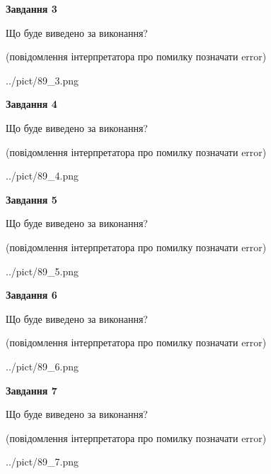 \documentclass[12pt, ukrainian]{article}
\begin{document}
{\begin {large}
{\begin {center}\textbf{Завдання 3}\end {center}}\par
Що буде виведено за виконання?\par
 (повідомлення інтерпретатора про помилку позначати error)\par
\begin{center}
	{../pict/89_3.png}
\end{center}
\newpage

{\begin {center}\textbf{Завдання 4}\end {center}}\par
Що буде виведено за виконання?\par
 (повідомлення інтерпретатора про помилку позначати error)\par
\begin{center}
	{../pict/89_4.png}
\end{center}
\newpage

{\begin {center}\textbf{Завдання 5}\end {center}}\par
Що буде виведено за виконання?\par
 (повідомлення інтерпретатора про помилку позначати error)\par
\begin{center}
	{../pict/89_5.png}
\end{center}
\newpage

{\begin {center}\textbf{Завдання 6}\end {center}}\par
Що буде виведено за виконання?\par
 (повідомлення інтерпретатора про помилку позначати error)\par
\begin{center}
	{../pict/89_6.png}
\end{center}
\newpage

{\begin {center}\textbf{Завдання 7}\end {center}}\par
Що буде виведено за виконання?\par
 (повідомлення інтерпретатора про помилку позначати error)\par
\begin{center}
	{../pict/89_7.png}
\end{center}
\newpage


\end{large}}
\end{document}
